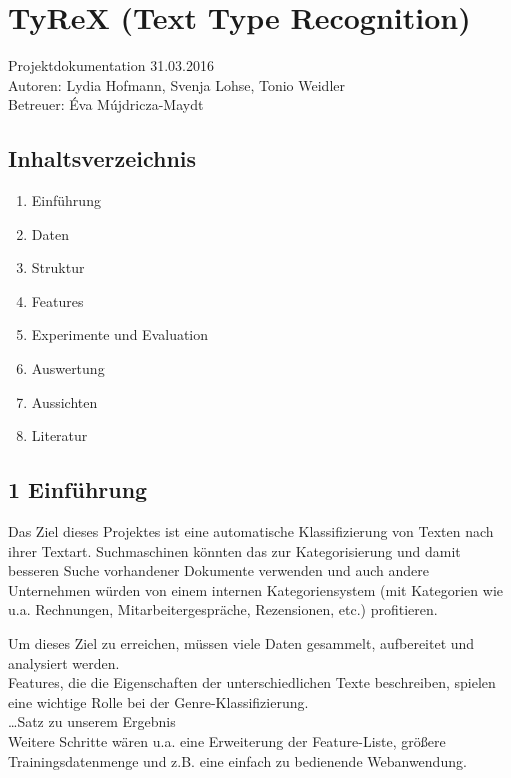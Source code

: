 \documentclass[]{article}
\date{}
\providecommand{\tightlist}{%
  \setlength{\itemsep}{0pt}\setlength{\parskip}{0pt}}
\begin{document}
\section{TyReX (Text Type
Recognition)}\label{tyrex-text-type-recognition}

Projektdokumentation 31.03.2016\\
Autoren: Lydia Hofmann, Svenja Lohse, Tonio Weidler\\
Betreuer: Éva Mújdricza-Maydt

\subsection{Inhaltsverzeichnis}\label{inhaltsverzeichnis}

\begin{enumerate}
\def\labelenumi{\arabic{enumi}.}
\tightlist
\item
  Einführung\\
\item
  Daten\\
\item
  Struktur
\item
  Features\\
\item
  Experimente und Evaluation
\item
  Auswertung
\item
  Aussichten\\
\item
  Literatur
\end{enumerate}

\subsection{1 Einführung}\label{einfuxfchrung}

Das Ziel dieses Projektes ist eine automatische Klassifizierung von
Texten nach ihrer Textart. Suchmaschinen könnten das zur Kategorisierung
und damit besseren Suche vorhandener Dokumente verwenden und auch andere
Unternehmen würden von einem internen Kategoriensystem (mit Kategorien
wie u.a. Rechnungen, Mitarbeitergespräche, Rezensionen, etc.)
profitieren.

Um dieses Ziel zu erreichen, müssen viele Daten gesammelt, aufbereitet
und analysiert werden.\\
Features, die die Eigenschaften der unterschiedlichen Texte beschreiben,
spielen eine wichtige Rolle bei der Genre-Klassifizierung.\\
\ldots{}Satz zu unserem Ergebnis\\
Weitere Schritte wären u.a. eine Erweiterung der Feature-Liste, größere
Trainingsdatenmenge und z.B. eine einfach zu bedienende Webanwendung.
\end{document}
